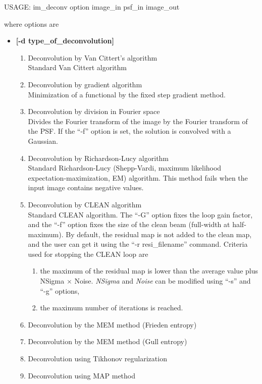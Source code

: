 \begin{itemize}
{\bf
\begin{center}
 USAGE: im\_deconv option image\_in psf\_in image\_out
\end{center}}
where options are 
\begin{itemize}
\baselineskip=0.4truecm
\itemsep=0.1truecm
\item {\bf [-d type\_of\_deconvolution]}
\begin{enumerate}
\baselineskip=0.4truecm
\item  Deconvolution by Van Cittert's algorithm \\
Standard Van Cittert algorithm
\item  Deconvolution by gradient algorithm \\
Minimization of a functional by the fixed step gradient method.
\item  Deconvolution by division in Fourier space \\
Divides the Fourier transform of the image by the Fourier transform
of the PSF. If the ``-f'' option is set, the solution is convolved with a 
Gaussian.
\item  Deconvolution by Richardson-Lucy algorithm \\
Standard Richardson-Lucy (Shepp-Vardi, maximum likelihood 
expectation-maximization, EM) algorithm. This method fails
when the input image contains negative values.
\item  Deconvolution by CLEAN algorithm \\
Standard CLEAN algorithm. The ``-G'' option fixes the loop gain factor, and
the ``-f'' option 
fixes the size of the clean beam (full-width at half-maximum).
By default, the residual map is not added to the clean map, and the user
can get it using the ``-r resi\_filename'' command. Criteria  
used for stopping the CLEAN loop are 
\begin{enumerate}
\item the maximum of the residual map is lower than the average 
value plus NSigma $\times$ Noise.
{\em NSigma} and {\em Noise} can be modified  using ``-s'' and ``-g'' options,
\item the maximum number of iterations is reached.
\end{enumerate}
\item Deconvolution by the MEM method (Frieden entropy)
\item Deconvolution by the MEM method (Gull entropy)
\item Deconvolution using Tikhonov regularization 
\item Deconvolution using MAP method

\end{enumerate}
\end{itemize}
\end{itemize}

